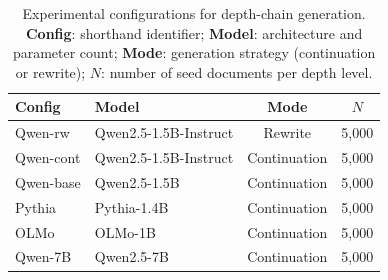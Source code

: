 \begin{table}[t]
\centering
\small
\caption{Experimental configurations for depth-chain generation. \textbf{Config}: shorthand identifier; \textbf{Model}: architecture and parameter count; \textbf{Mode}: generation strategy (continuation or rewrite); $N$: number of seed documents per depth level.}
\label{tab:setup}
\begin{tabular}{llcc}
\toprule
\textbf{Config} & \textbf{Model} & \textbf{Mode} & $N$ \\
\midrule
Qwen-rw   & Qwen2.5-1.5B-Instruct & Rewrite & 5{,}000 \\
Qwen-cont & Qwen2.5-1.5B-Instruct & Continuation & 5{,}000 \\
Qwen-base & Qwen2.5-1.5B          & Continuation & 5{,}000 \\
Pythia    & Pythia-1.4B            & Continuation & 5{,}000 \\
OLMo      & OLMo-1B               & Continuation & 5{,}000 \\
Qwen-7B   & Qwen2.5-7B            & Continuation & 5{,}000 \\
\bottomrule
\end{tabular}
\end{table}
